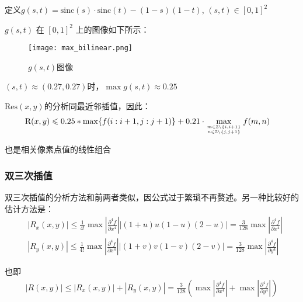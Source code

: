 \documentclass{article}
\begin{document}
定义$g(s,t) =  \mathrm{sinc}(s) \cdot \mathrm{sinc}(t) - (1-s)(1-t)$, $(s,t)\in [0,1]^{2}$

$g(s,t)$ 在 $[0,1]^2$ 上的图像如下所示：

\begin{figure}[H]
    \centering
    \texttt{[image: max\_bilinear.png]}
    \caption{$g(s,t)$图像}
    \label{fig:3.2}
\end{figure}

$(s,t)\approx (0.27,0.27)$时，$\max{g(s,t)} \approx 0.25$

$\mathrm{Res}(x,y)$的分析同最近邻插值，因此：
\begin{equation}
	\begin{aligned}
		& \mathrm{R}(x,y) \leqslant 0.25 * \max\{f(i:i+1, j:j+1)\} + 0.21 \cdot \max_{m\in\mathbb{Z}\backslash\{i,i+1\}\atop n\in\mathbb{Z}\backslash\{j,j+1\}}{f(m,n)}
	\end{aligned}
\end{equation}

也是相关像素点值的线性组合

\subsubsection{双三次插值}

双三次插值的分析方法和前两者类似，因公式过于繁琐不再赘述。另一种比较好的估计方法是：
\begin{equation}
	\begin{aligned}
	& \left|R_{x}(x, y)\right| \leqslant \frac{1}{4 !} \max \left|\frac{\partial^{4} f}{\partial x^{4}}\right||(1+u)u(1-u)(2-u)|=\frac{3}{128} \max \left|\frac{\partial^{4} f}{\partial x^{4}}\right|\\
	& \left|R_{y}(x, y)\right| \leqslant \frac{1}{4 !} \max \left|\frac{\partial^{4} f}{\partial x^{4}}\right||(1+v)v(1-v)(2-v)|=\frac{3}{128} \max \left|\frac{\partial^{4} f}{\partial y^{4}}\right|
	\end{aligned}
\end{equation}

也即
\begin{equation}
	\begin{aligned}
		|R(x,y)|\leqslant \left|R_{x}(x, y)\right|+\left|R_{y}(x, y)\right|=\frac{3}{128}\left(\max \left|\frac{\partial^{4} f}{\partial x^{4}}\right|+\max \left|\frac{\partial^{4} f}{\partial y^{4}}\right|\right)
	\end{aligned}
\end{equation}
\end{document}
